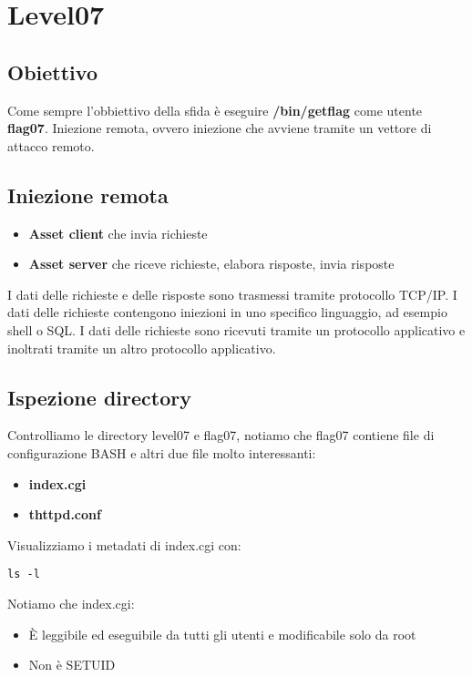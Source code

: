 \section{Level07}
\subsection{Obiettivo}
Come sempre l'obbiettivo della sfida è eseguire \textbf{/bin/getflag} come utente \textbf{flag07}.
Iniezione remota, ovvero iniezione che avviene tramite un vettore di attacco remoto.
\subsection{Iniezione remota}
\begin{itemize}
    \item \textbf{Asset client} che invia richieste
    \item \textbf{Asset server} che riceve richieste, elabora risposte, invia risposte
\end{itemize}
I dati delle richieste e delle risposte sono trasmessi tramite protocollo TCP/IP.
I dati delle richieste contengono iniezioni in uno specifico linguaggio, ad esempio shell o SQL.
I dati delle richieste sono ricevuti tramite un protocollo applicativo e inoltrati tramite un altro protocollo applicativo.



\subsection{Ispezione directory}
Controlliamo le directory level07 e flag07, notiamo che flag07 contiene file di configurazione BASH e altri due file molto interessanti:
\begin{itemize}
    \item \textbf{index.cgi}
    \item \textbf{thttpd.conf}
\end{itemize}
Visualizziamo i metadati di index.cgi con:
\begin{lstlisting}[style=bashstyle]
    ls -l
\end{lstlisting}
Notiamo che index.cgi:
\begin{itemize}
    \item È leggibile ed eseguibile da tutti gli utenti e modificabile solo da root
    \item Non è SETUID
\end{itemize}

